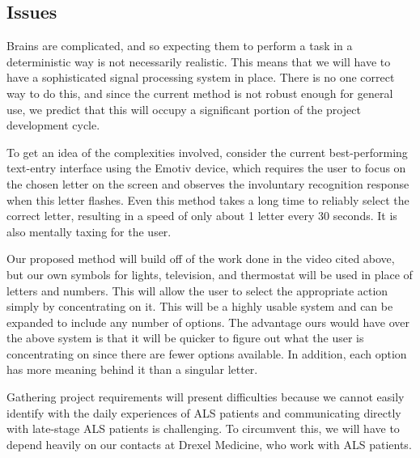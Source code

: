 \documentclass{report}
\begin{document}
\subsection*{Issues}

Brains are complicated, and so expecting them to perform a task in a
deterministic way is not necessarily realistic. This means that we will have
to have a sophisticated signal processing system in place. There is no one
correct way to do this, and since the current method is not robust enough
for general use, we predict that this will occupy a significant portion of
the project development cycle.

To get an idea of the complexities involved, consider the current
best-performing text-entry interface using the Emotiv device, which requires
the user to focus on the chosen letter on the screen and observes the
involuntary recognition response when this letter flashes. Even this method
takes a long time to reliably select the correct letter, resulting in a speed
of only about 1 letter every 30 seconds. It is also mentally taxing for the
user. \cite{textentry}

Our proposed method will build off of the work done in the video cited above, but our own symbols for lights, television, and thermostat will be used in place of letters and numbers. This will allow the user to select the appropriate action simply by concentrating on it. This will be a highly usable system and can be expanded to include any number of options. The advantage ours would have over the above system is that it will be quicker to figure out what the user is concentrating on since there are fewer options available. In addition, each option has more meaning behind it than a singular letter.

Gathering project requirements will present difficulties because we cannot
easily identify with the daily experiences of ALS patients and communicating
directly with late-stage ALS patients is challenging. To circumvent this, we
will have to depend heavily on our contacts at Drexel Medicine, who work
with ALS patients.
\end{document}
